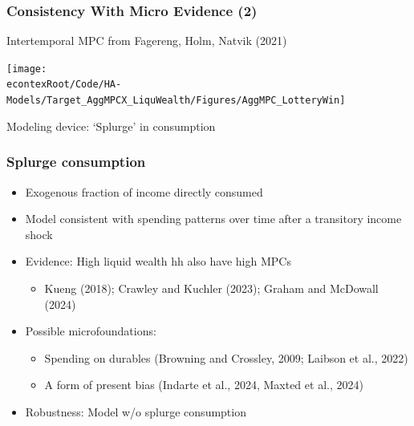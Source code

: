 \documentclass[pdflatex,aspectratio=169]{beamer}
\begin{document}
\begin{frame}
	\frametitle{Consistency With Micro Evidence (2)}
			Intertemporal MPC from Fagereng, Holm, Natvik (2021)
			\begin{center}
			\texttt{[image: \\econtexRoot/Code/HA-Models/Target\_AggMPCX\_LiquWealth/Figures/AggMPC\_LotteryWin]}
			\end{center}			
			Modeling device: `Splurge' in consumption
\end{frame}


\begin{frame}
\frametitle{Splurge consumption}
\begin{itemize}
	\itemsep = .75\bigskipamount 
	\item Exogenous fraction of income directly consumed
	\item Model consistent with spending patterns over time after a transitory income shock
	\item Evidence: High liquid wealth hh also have high MPCs
	\begin{itemize}
		\itemsep = .25\bigskipamount 
		\item Kueng (2018); Crawley and Kuchler (2023); Graham and McDowall (2024) 
	\end{itemize}
	\item Possible microfoundations: 
	\begin{itemize}
	\itemsep = .25\bigskipamount 
	\item Spending on durables (Browning and Crossley, 2009; Laibson et al., 2022)
	\item A form of present bias (Indarte et al., 2024, Maxted et al., 2024)
	\end{itemize}
	\item Robustness: Model w/o splurge consumption 
\end{itemize}
\end{frame}
\end{document}
